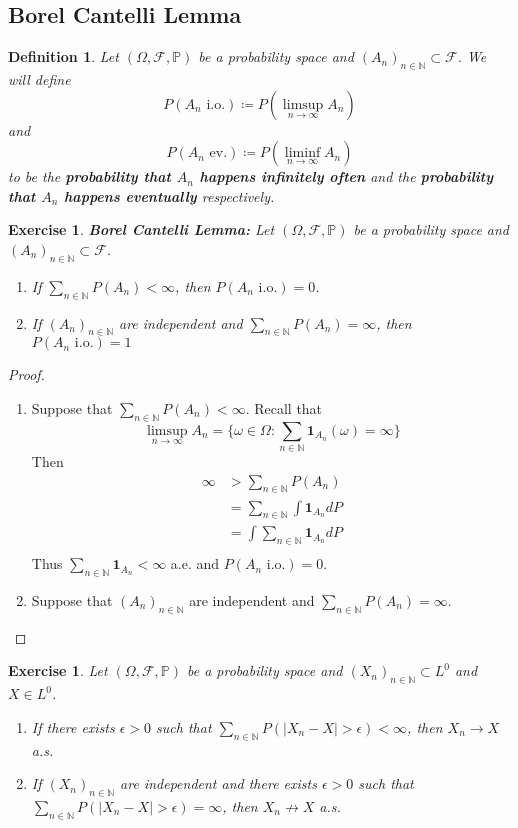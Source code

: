 \documentclass[12pt]{amsart}
\newtheorem{defn}[thm]{Definition}
\newtheorem{ex}[thm]{Exercise}
\newcommand{\ep}{\epsilon}
\newcommand{\om}{\omega}
\newcommand{\Om}{\Omega}
\newcommand{\N}{\mathbb{N}}
\renewcommand{\P}{\mathbb{P}}
\newcommand{\MF}{\mathcal{F}}
\newcommand{\io}{\text{ i.o.}}
\newcommand{\ev}{\text{ ev.}}
\begin{document}
\subsection{Borel Cantelli Lemma} 

\begin{defn}
	Let $(\Om, \MF, \P)$ be a probability space and $(A_n)_{n \in \N} \subset \MF$. We will define $$P(A_n \io) \coloneqq P(\limsup_{n \rightarrow \infty}A_n) $$ and $$P(A_n \ev) \coloneqq P(\liminf_{n \rightarrow \infty} A_n)$$ to be the \textbf{probability that $A_n$ happens infinitely often} and the \textbf{probability that $A_n$ happens eventually} respectively.  
\end{defn}

\begin{ex}\textbf{Borel Cantelli Lemma:}
	Let $(\Om, \MF, \P)$ be a probability space and $(A_n)_{n \in \N} \subset \MF$.
	\begin{enumerate}
		\item If $\sum\limits_{n \in \N}P(A_n) < \infty$, then $P(A_n \io) = 0$.
		\item If $(A_n)_{n \in \N}$ are independent and $\sum\limits_{n \in \N} P(A_n) = \infty$, then $P(A_n \io) = 1$  
	\end{enumerate}
\end{ex}

\begin{proof}\
	\begin{enumerate}
		\item Suppose that $\sum\limits_{n \in \N}P(A_n) < \infty$. Recall that $$\limsup\limits_{n \rightarrow \infty}A_n = \bigg \{\om \in \Om: \sum\limits_{n \in \N}\mathbf{1}_{A_n}(\om) = \infty \bigg \}$$ Then \begin{align*}
			\infty 
			&> \sum_{n \in \N}P(A_n) \\
			&= \sum_{n \in \N} \int \mathbf{1}_{A_n}dP \\
			&= \int \sum_{n \in \N} \mathbf{1}_{A_n}dP \\
		\end{align*}
		Thus $\sum\limits_{n \in \N} \mathbf{1}_{A_n} < \infty$ a.e. and $P(A_n \io) = 0$.
		\item Suppose that $(A_n)_{n \in \N}$ are independent and $\sum\limits_{n \in \N} P(A_n) = \infty$.
	\end{enumerate}
\end{proof}

\begin{ex}
	Let $(\Om, \MF, \P)$ be a probability space and $(X_n)_{n \in \N} \subset L^0$ and $X \in L^0$. 
	\begin{enumerate}
		\item If there exists $\ep >0 $ such that $\sum\limits_{n \in \N} P(|X_n -X| > \ep) < \infty$, then $X_n \rightarrow X$ a.s.
		\item If $(X_n)_{n \in \N}$ are independent and there exists $\ep >0$ such that $\sum\limits_{n \in \N} P(|X_n -X| > \ep) = \infty$, then $X_n \not \rightarrow X$ a.s.
	\end{enumerate}
\end{ex}
\end{document}
